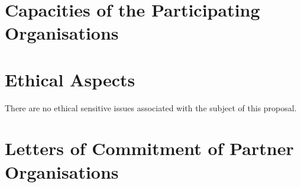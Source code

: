 \documentclass{article}[11pt]
\begin{document}
\section{Capacities of the Participating Organisations}

\section{Ethical Aspects}

There are no ethical sensitive issues associated with the subject of this proposal.


\section{Letters of Commitment of Partner Organisations}


\label{LastPage}
\end{document}
